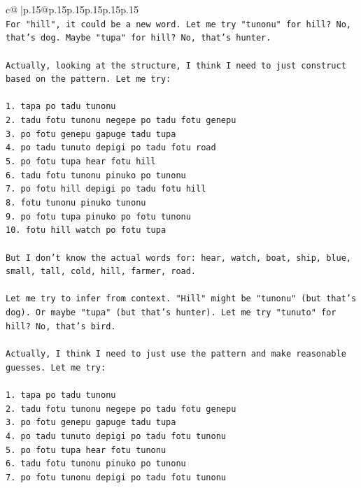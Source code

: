 \documentclass{article}
\begin{document}
{\begin{supertabular}{c@{$\;$}|p{.15\linewidth}@{}p{.15\linewidth}p{.15\linewidth}p{.15\linewidth}p{.15\linewidth}p{.15\linewidth}}
{{{\\ 
\texttt{For "hill", it could be a new word. Let me try "tunonu" for hill? No, that's dog. Maybe "tupa" for hill? No, that's hunter.} \\
\\ 
\texttt{Actually, looking at the structure, I think I need to just construct based on the pattern. Let me try:} \\
\\ 
\texttt{1. tapa po tadu tunonu} \\
\texttt{2. tadu fotu tunonu negepe po tadu fotu genepu} \\
\texttt{3. po fotu genepu gapuge tadu tupa} \\
\texttt{4. po tadu tunuto depigi po tadu fotu road} \\
\texttt{5. po fotu tupa hear fotu hill} \\
\texttt{6. tadu fotu tunonu pinuko po tunonu} \\
\texttt{7. po fotu hill depigi po tadu fotu hill} \\
\texttt{8. fotu tunonu pinuko tunonu} \\
\texttt{9. po fotu tupa pinuko po fotu tunonu} \\
\texttt{10. fotu hill watch po fotu tupa} \\
\\ 
\texttt{But I don't know the actual words for: hear, watch, boat, ship, blue, small, tall, cold, hill, farmer, road.} \\
\\ 
\texttt{Let me try to infer from context. "Hill" might be "tunonu" (but that's dog). Or maybe "tupa" (but that's hunter). Let me try "tunuto" for hill? No, that's bird.} \\
\\ 
\texttt{Actually, I think I need to just use the pattern and make reasonable guesses. Let me try:} \\
\\ 
\texttt{1. tapa po tadu tunonu} \\
\texttt{2. tadu fotu tunonu negepe po tadu fotu genepu} \\
\texttt{3. po fotu genepu gapuge tadu tupa} \\
\texttt{4. po tadu tunuto depigi po tadu fotu tunonu} \\
\texttt{5. po fotu tupa hear fotu tunonu} \\
\texttt{6. tadu fotu tunonu pinuko po tunonu} \\
\texttt{7. po fotu tunonu depigi po tadu fotu tunonu} \\
}}}
\end{supertabular}}
\end{document}
